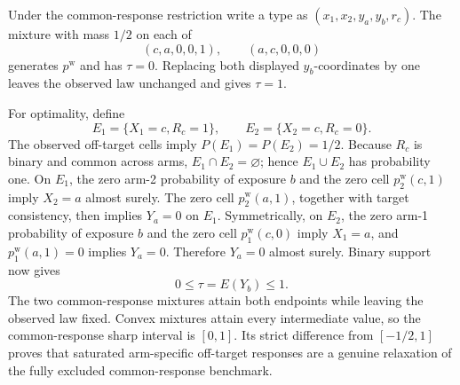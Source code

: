 Under the common-response restriction write a type as \((x_1,x_2,y_a,y_b,r_c)\).  The mixture with mass \(1/2\) on each of
\[
(c,a,0,0,1),
\qquad
(a,c,0,0,0)
\]
generates \(p^{\mathrm w}\) and has \(\tau=0\).  Replacing both displayed \(y_b\)-coordinates by one leaves the observed law unchanged and gives \(\tau=1\).

For optimality, define
\[
E_1=\{X_1=c,R_c=1\},
\qquad
E_2=\{X_2=c,R_c=0\}.
\]
The observed off-target cells imply \(P(E_1)=P(E_2)=1/2\).  Because \(R_c\) is binary and common across arms, \(E_1\cap E_2=\varnothing\); hence \(E_1\cup E_2\) has probability one.  On \(E_1\), the zero arm-2 probability of exposure \(b\) and the zero cell \(p^{\mathrm w}_2(c,1)\) imply \(X_2=a\) almost surely.  The zero cell \(p^{\mathrm w}_2(a,1)\), together with target consistency, then implies \(Y_a=0\) on \(E_1\).  Symmetrically, on \(E_2\), the zero arm-1 probability of exposure \(b\) and the zero cell \(p^{\mathrm w}_1(c,0)\) imply \(X_1=a\), and \(p^{\mathrm w}_1(a,1)=0\) implies \(Y_a=0\).  Therefore \(Y_a=0\) almost surely.  Binary support now gives
\[
0\le\tau=E(Y_b)\le1.
\]
The two common-response mixtures attain both endpoints while leaving the observed law fixed.  Convex mixtures attain every intermediate value, so the common-response sharp interval is \([0,1]\).  Its strict difference from \([-1/2,1]\) proves that saturated arm-specific off-target responses are a genuine relaxation of the fully excluded common-response benchmark.
